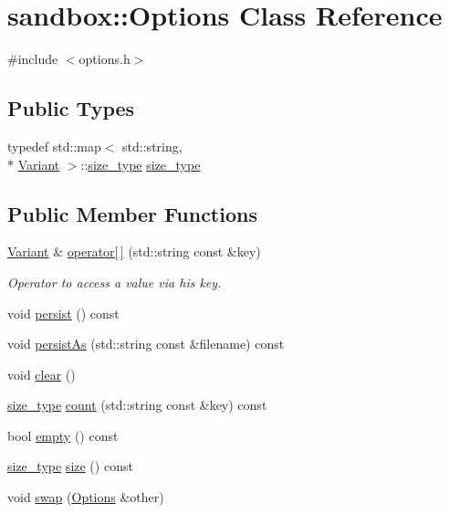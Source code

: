 \hypertarget{classsandbox_1_1_options}{\section{sandbox\-:\-:Options Class Reference}
\label{classsandbox_1_1_options}
}


{\ttfamily \#include $<$options.\-h$>$}

\subsection*{Public Types}
\begin{DoxyCompactItemize}
\item 
typedef std\-::map$<$ std\-::string, \\*
\hyperlink{classsandbox_1_1_variant}{Variant} $>$\-::\hyperlink{classsandbox_1_1_options_a9198beb778c2c79387c07e658513f67e}{size\-\_\-type} \hyperlink{classsandbox_1_1_options_a9198beb778c2c79387c07e658513f67e}{size\-\_\-type}
\end{DoxyCompactItemize}
\subsection*{Public Member Functions}
\begin{DoxyCompactItemize}
\item 
\hyperlink{classsandbox_1_1_variant}{Variant} \& \hyperlink{classsandbox_1_1_options_a4fe2e4746d733d22f47cc32d1c54c860}{operator\mbox{[}$\,$\mbox{]}} (std\-::string const \&key)
\begin{DoxyCompactList}\small\item\em Operator to access a value via his key. \end{DoxyCompactList}\item 
void \hyperlink{classsandbox_1_1_options_a13c5e5baca25cfb45c6b7bcc36d8baa8}{persist} () const 
\item 
void \hyperlink{classsandbox_1_1_options_aa2a685602e242e5aaf158be6d5da27b5}{persist\-As} (std\-::string const \&filename) const 
\item 
void \hyperlink{classsandbox_1_1_options_a5837cd3c1fdd46a56de119637d12cb62}{clear} ()
\item 
\hyperlink{classsandbox_1_1_options_a9198beb778c2c79387c07e658513f67e}{size\-\_\-type} \hyperlink{classsandbox_1_1_options_af760738139312e7ba9fd36763e7a607a}{count} (std\-::string const \&key) const 
\item 
bool \hyperlink{classsandbox_1_1_options_a8feb3fb138eb93299d67c37f3c3f605e}{empty} () const 
\item 
\hyperlink{classsandbox_1_1_options_a9198beb778c2c79387c07e658513f67e}{size\-\_\-type} \hyperlink{classsandbox_1_1_options_a283044e8a4a010d9c921305c779ea50d}{size} () const 
\item 
void \hyperlink{classsandbox_1_1_options_a3e6c36826aa7f9baf408c1b94a995fb0}{swap} (\hyperlink{classsandbox_1_1_options}{Options} \&other)
\end{DoxyCompactItemize}
